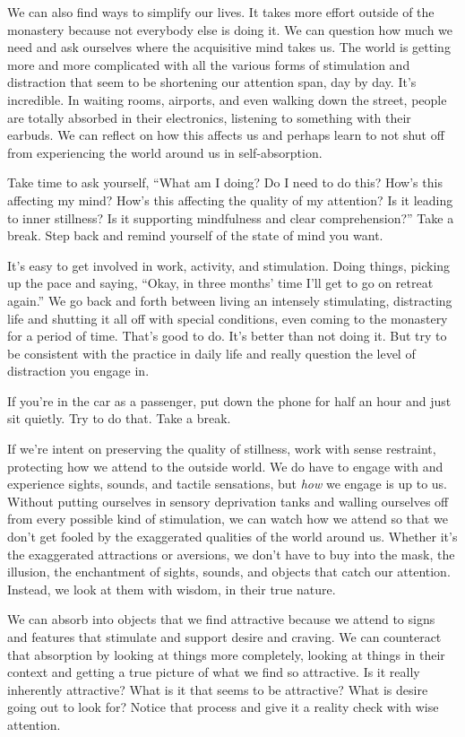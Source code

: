 We can also find ways to simplify our lives. It takes more effort outside of the monastery because not everybody else is doing it. We can question how much we need and ask ourselves where the acquisitive mind takes us. The world is getting more and more complicated with all the various forms of stimulation and distraction that seem to be shortening our attention span, day by day. It's incredible. In waiting rooms, airports, and even walking down the street, people are totally absorbed in their electronics, listening to something with their earbuds. We can reflect on how this affects us and perhaps learn to not shut off from experiencing the world around us in self-absorption.~

Take time to ask yourself, ``What am I doing? Do I need to do this? How's this affecting my mind? How's this affecting the quality of my attention? Is it leading to inner stillness? Is it supporting mindfulness and clear comprehension?'' Take a break. Step back and remind yourself of the state of mind you want.

It's easy to get involved in work, activity, and stimulation. Doing things, picking up the pace and saying, ``Okay, in three months' time I'll get to go on retreat again.'' We go back and forth between living an intensely stimulating, distracting life and shutting it all off with special conditions, even coming to the monastery for a period of time. That's good to do. It's better than not doing it. But try to be consistent with the practice in daily life and really question the level of distraction you engage in.~

If you're in the car as a passenger, put down the phone for half an hour and just sit quietly. Try to do that. Take a break.

If we're intent on preserving the quality of stillness, work with sense restraint, protecting how we attend to the outside world. We do have to engage with and experience sights, sounds, and tactile sensations, but \emph{how} we engage is up to us. Without putting ourselves in sensory deprivation tanks and walling ourselves off from every possible kind of stimulation, we can watch how we attend so that we don't get fooled by the exaggerated qualities of the world around us. Whether it's the exaggerated attractions or aversions, we don't have to buy into the mask, the illusion, the enchantment of sights, sounds, and objects that catch our attention. Instead, we look at them with wisdom, in their true nature.~

We can absorb into objects that we find attractive because we attend to signs and features that stimulate and support desire and craving. We can counteract that absorption by looking at things more completely, looking at things in their context and getting a true picture of what we find so attractive. Is it really inherently attractive? What is it that seems to be attractive? What is desire going out to look for? Notice that process and give it a reality check with wise attention.~

